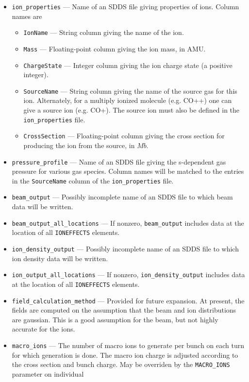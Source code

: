 \documentclass[11pt]{article}
\begin{document}
\begin{itemize}
\item \verb|ion_properties| --- Name of an SDDS file giving properties of ions. Column names are
  \begin{itemize}
  \item \verb|IonName| --- String column giving the name of the ion.
  \item \verb|Mass| --- Floating-point column giving the ion mass, in AMU.
  \item \verb|ChargeState| --- Integer column giving the ion charge state (a positive integer).
  \item \verb|SourceName| --- String column giving the name of the source gas for this ion.
    Alternately, for a multiply ionized molecule (e.g. CO++) one can give a source ion (e.g. CO+).  The source ion must also be defined in the \verb|ion_properties| file.
  \item \verb|CrossSection| --- Floating-point column giving the cross section for producing the ion from the source, in $Mb$.
  \end{itemize}
\item \verb|pressure_profile| --- Name of an SDDS file giving the s-dependent gas pressure for
  various gas species. Column names will be matched to the entries in the \verb|SourceName| column of the
  \verb|ion_properties| file.
\item \verb|beam_output| --- Possibly incomplete name of an SDDS file to which beam data will be written.
\item \verb|beam_output_all_locations| --- If nonzero, \verb|beam_output| includes data at the location of
  all \verb|IONEFFECTS| elements.
\item \verb|ion_density_output| --- Possibly incomplete name of an SDDS file to which ion density data will be written.
\item \verb|ion_output_all_locations| --- If nonzero, \verb|ion_density_output| includes data at the location of
  all \verb|IONEFFECTS| elements.
\item \verb|field_calculation_method| --- Provided for future expansion. At present, the fields are computed on the
  assumption that the beam and ion distributions are gaussian. This is a good assumption for the beam, but not highly accurate
  for the ions.
\item \verb|macro_ions| --- The number of macro ions to generate per bunch on each turn for which generation is done. 
  The macro ion charge is adjusted
  according to the cross section and bunch charge. May be overriden by the \verb|MACRO_IONS| parameter on individual

\end{itemize}
\end{document}

